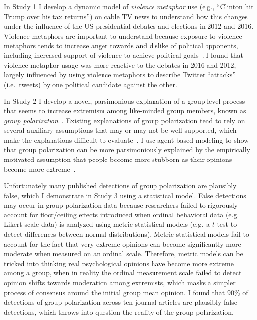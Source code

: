 In Study 1 I develop a dynamic model of \emph{violence metaphor} use (e.g.,
``Clinton hit Trump over his tax returns'') on cable TV news to understand how
this changes under the influence of the US presidential debates and elections
in 2012 and 2016. Violence metaphors are important to understand because 
exposure to violence metaphors tends to increase anger towards and dislike of 
political opponents, including increased support of violence to achieve
political goals~\cite{Kalmoe2014,Kalmoe2018}.
I found that violence metaphor usage was more reactive to
the debates in 2016 and 2012, largely influenced by using violence metaphors
to describe Twitter ``attacks'' (i.e.\ tweets) by one political candidate
against the other. 

In Study 2 I develop a novel, parsimonious explanation of a group-level process that seems
to increase extremism among like-minded group members, known as
\emph{group polarization}~\cite{Brown1986,Isenberg1986,Brown2000,Sunstein2002}.
Existing explanations of group polarization tend to rely on several auxiliary
assumptions that may or may not be well supported, which make the explanations
difficult to evaluate~\cite{Meehl1990}. I use agent-based modeling to
show that group polarization can
be more parsimoniously explained by the empirically motivated assumption 
that people become more stubborn as their opinions become more 
extreme~\cite{Reiss2019,Zmigrod2019a,Kinder2017}. 

Unfortunately many published detections
of group polarization are plausibly false, which I demonstrate in
Study 3 using a statistical model. False detections may occur in group polarization
data because researchers failed to rigorously account for floor/ceiling effects
introduced when ordinal behavioral data (e.g. Likert scale data) is analyzed
using metric statistical models (e.g.\ a $t$-test to detect differences between
normal distributions). Metric statistical models fail to account for
the fact that very extreme opinions can become significantly more moderate
when measured on an ordinal scale. Therefore, metric models can be tricked into
thinking real psychological opinions have become more extreme among a group,
when in reality the ordinal measurement scale failed to detect opinion shifts
towards moderation among extremists, 
which masks a simpler process of consensus around the initial group mean opinion.
I found that 90\% of detections of group polarization across ten journal articles
are plausibly false detections, which throws into question the reality of
the group polarization.

